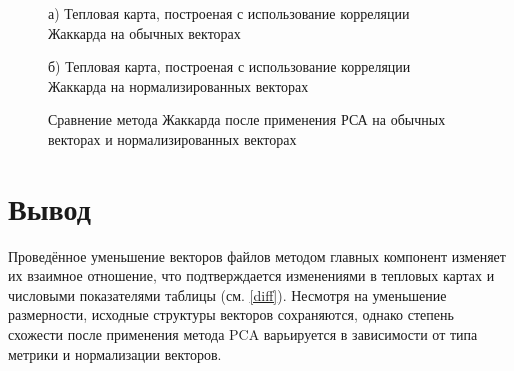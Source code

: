 \begin{figure}[H]
    \begin{minipage}[H]{0.5\linewidth}
        а) Тепловая карта, построеная с использование корреляции Жаккарда на обычных векторах
    \end{minipage}
    \begin{minipage}[H]{0.5\linewidth}
        б) Тепловая карта, построеная с использование корреляции Жаккарда на нормализированных векторах
    \end{minipage}
    \caption{Сравнение метода Жаккарда после применения РСА на обычных векторах и нормализированных векторах}
    \label{fig:minipageHeatmapJac}
\end{figure}

\section{Вывод}

Проведённое уменьшение векторов файлов методом главных компонент изменяет их взаимное отношение, 
что подтверждается изменениями в тепловых картах и числовыми показателями таблицы (см. \ref{diff}). 
Несмотря на уменьшение размерности, исходные структуры векторов сохраняются, 
однако степень схожести после применения метода PCA варьируется в зависимости от типа метрики и нормализации векторов.

\clearpage
